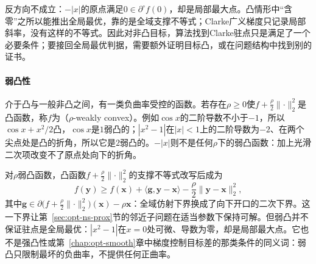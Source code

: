 反方向不成立：$-|x|$的原点满足$0\in\partial^\circ f(0)$，却是局部最大点。凸情形中“含零”之所以能推出全局最优，靠的是全域支撑不等式；Clarke广义梯度只记录局部斜率，没有这样的不等式。因此对非凸目标，算法找到Clarke驻点只是满足了一个必要条件；要接回全局最优判据，需要额外证明目标凸，或在问题结构中找到别的证书。

\paragraph{弱凸性}
介于凸与一般非凸之间，有一类负曲率受控的函数。若存在$\rho\geq0$使$f+\frac\rho2\lVert\cdot\rVert_2^2$是凸函数，称$f$为（$\rho$-weakly convex）。例如$\cos x$的二阶导数不小于$-1$，所以$\cos x+x^2/2$凸，$\cos x$是$1$弱凸的；$|x^2-1|$在$|x|<1$上的二阶导数为$-2$、在两个尖点处是凸的折角，所以它是$2$弱凸的。$-|x|$则不是任何$\rho$下的弱凸函数：加上光滑二次项改变不了原点处向下的折角。

对$\rho$弱凸函数，凸函数$f+\frac\rho2\lVert\cdot\rVert_2^2$的支撑不等式改写后成为
\[
 f(\bm y)\geq f(\bm x)+\langle\bm g,\bm y-\bm x\rangle-\frac\rho2\lVert\bm y-\bm x\rVert_2^2,
\]
其中$\bm g\in\partial\bigl(f+\frac\rho2\lVert\cdot\rVert_2^2\bigr)(\bm x)-\rho\bm x$：全域仿射下界换成了向下开口的二次下界。这一下界让第~\ref{sec:opt-ns-prox}节的邻近子问题在适当参数下保持可解。但弱凸并不保证驻点是全局最优：$|x^2-1|$在$x=0$处可微、导数为零，却是局部最大点。它也不是强凸性或第~\ref{chap:opt-smooth}章中梯度控制目标差的那类条件的同义词：弱凸只限制最坏的负曲率，不提供任何正曲率。
